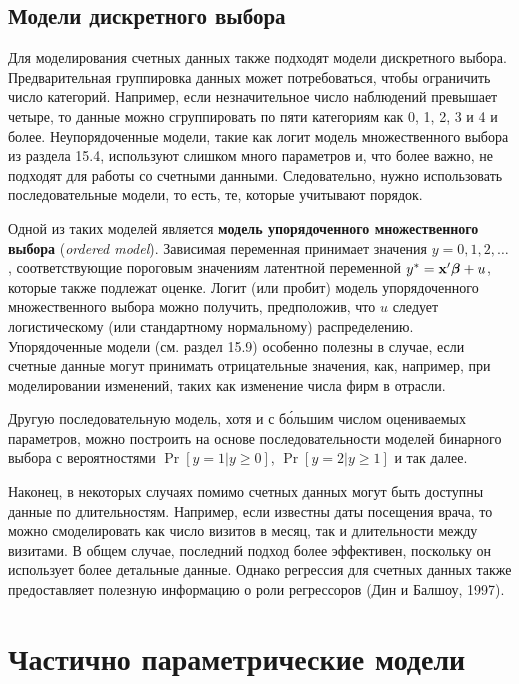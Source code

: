 \subsection{Модели дискретного выбора}\label{sec:20.4.6}

\noindent
Для моделирования счетных данных также подходят модели дискретного выбора. Предварительная группировка данных может потребоваться, чтобы ограничить число категорий. Например, если незначительное число наблюдений превышает четыре, то данные можно сгруппировать по пяти категориям как 0, 1, 2, 3 и 4 и более. Неупорядоченные модели, такие как логит модель множественного выбора из раздела 15.4, используют слишком много параметров и, что более важно, не подходят для работы со счетными данными. Следовательно, нужно использовать последовательные модели, то есть, те, которые учитывают порядок.

Одной из таких моделей является \textbf{модель упорядоченного множественного выбора} (\textit{ordered model}). %
Зависимая переменная принимает значения $y = 0, 1, 2, \ldots $, соответствующие пороговым значениям латентной переменной $y^* = \mathbf{x}'\bm{\beta} + u$, которые также подлежат оценке. Логит (или пробит) модель упорядоченного множественного выбора можно получить, предположив, что $u$ следует логистическому (или стандартному нормальному) распределению. Упорядоченные модели (см. раздел 15.9) особенно полезны в случае, если счетные данные могут принимать отрицательные значения, как, например, при моделировании изменений, таких как изменение числа фирм в отрасли.

Другую последовательную модель, хотя и с б\'{о}льшим числом оцениваемых параметров, можно построить на основе последовательности моделей бинарного выбора с вероятностями $\Pr[y = 1|y \ge 0]$, $\Pr[y = 2|y \ge 1]$ и так далее.

Наконец, в некоторых случаях помимо счетных данных могут быть доступны данные по длительностям. Например, если известны даты посещения врача, то можно смоделировать как число визитов в месяц, так и длительности между визитами. В общем случае, последний подход более эффективен, поскольку он использует более детальные данные. Однако регрессия для счетных данных также предоставляет полезную информацию о роли регрессоров (Дин и Балшоу, 1997).




\section{Частично параметрические модели}\label{sec:20.5}

